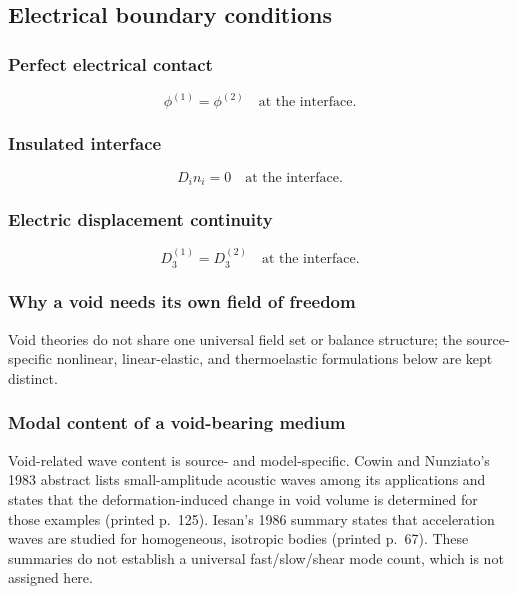\subsection{Electrical boundary conditions}
\label{sec:5.3}

\subsubsection{Perfect electrical contact}

\begin{equation}
\phi^{(1)} = \phi^{(2)} \quad \text{at the interface}.
\label{eq:5.11}
\end{equation}

\subsubsection{Insulated interface}

\begin{equation}
D_i n_i = 0 \quad \text{at the interface}.
\label{eq:5.12}
\end{equation}

\subsubsection{Electric displacement continuity}

\begin{equation}
D_3^{(1)} = D_3^{(2)} \quad \text{at the interface}.
\label{eq:5.13}
\end{equation}

\subsubsection{Why a void needs its own field of freedom}

Void theories do not share one universal field set or balance structure; the source-specific nonlinear, linear-elastic, and thermoelastic formulations below are kept distinct.

\subsubsection{Modal content of a void-bearing medium}

Void-related wave content is source- and model-specific. Cowin and Nunziato's 1983 abstract lists small-amplitude acoustic waves among its applications and states that the deformation-induced change in void volume is determined for those examples (printed p.~125). Iesan's 1986 summary states that acceleration waves are studied for homogeneous, isotropic bodies (printed p.~67). These summaries do not establish a universal fast/slow/shear mode count, which is not assigned here.

